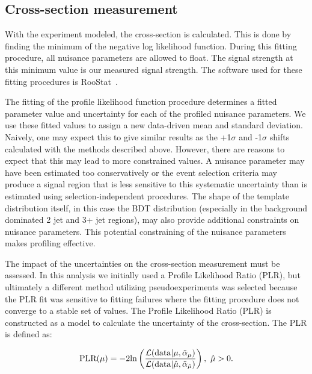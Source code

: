 \subsection{Cross-section measurement}
With the experiment modeled, the cross-section is calculated. This is done by finding the minimum of the negative log likelihood function. During this fitting procedure, all nuisance parameters are allowed to float. The signal strength at this minimum value is our measured signal strength. The software used for these fitting procedures is {\sc RooStat}~\cite{ROOSTAT}. 

The fitting of the profile likelihood function procedure determines a fitted parameter value and uncertainty for each of the profiled nuisance parameters. We use these fitted values to assign a new data-driven mean and standard deviation. Naively, one may expect this to give similar results as the +1$\sigma$ and -1$\sigma$ shifts calculated with the methods described above. However, there are reasons to expect that this may lead to more constrained values. A nuisance parameter may have been estimated too conservatively or the event selection criteria may produce a signal region that is less sensitive to this systematic uncertainty than is estimated using selection-independent procedures. The shape of the template distribution itself, in this case the BDT distribution (especially in the background dominated 2 jet and 3+ jet regions), may also provide additional constraints on nuisance parameters. This potential constraining of the nuisance parameters makes profiling effective. 

The impact of the uncertainties on the cross-section measurement must be assessed. In this analysis we initially used a Profile Likelihood Ratio (PLR), but ultimately a different method utilizing pseudoexperiments was selected because the PLR fit was sensitive to fitting failures where the fitting procedure does not converge to a stable set of values. The Profile Likelihood Ratio (PLR) is constructed as a model to calculate the uncertainty of the cross-section. The PLR is defined as:

\begin{equation}
\rm PLR(\mu) =-2ln\left(\frac{\mathcal{L}(data|\mu,{\vec{\alpha}}_{\mu}) }{ \mathcal{L}(data|\hat{\mu},{\vec{\alpha}}_{\hat{\mu}})}\right),\ \hat{\mu} > 0.
\end{equation}

